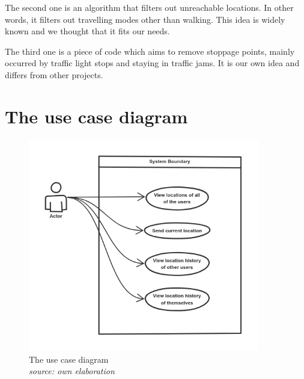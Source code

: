 The second one is an algorithm that filters out unreachable locations. In other words, it filters out travelling modes other than walking. This idea is widely known and we thought that it fits our needs.

The third one is a piece of code which aims to remove stoppage points, mainly occurred by traffic light stops and staying in traffic jams. It is our own idea and differs from other projects.

\section{The use case diagram}

\begin{figure}[H]
    \includegraphics[width=0.9\textwidth]{images/diagram.png}
    \caption{The use case diagram \\ \textit{source: own elaboration}}
\end{figure}
